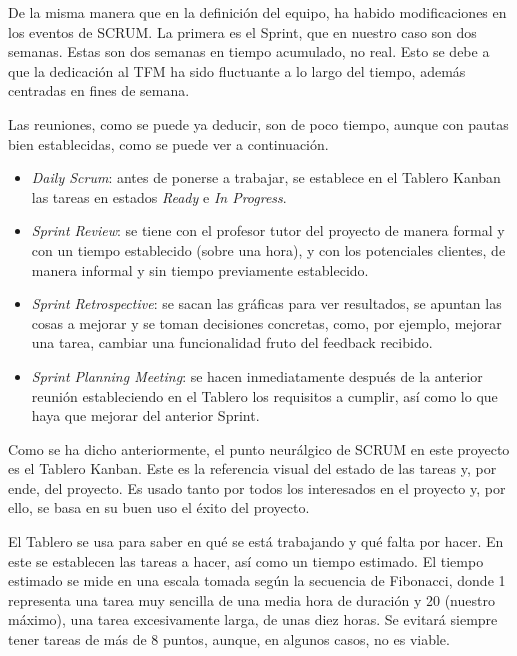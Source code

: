 De la misma manera que en la definición del equipo, ha habido modificaciones en los eventos de SCRUM. La primera es el Sprint, que en nuestro caso son dos semanas. Estas son dos semanas en tiempo acumulado, no real. Esto se debe a que la dedicación al TFM ha sido fluctuante a lo largo del tiempo, además centradas en fines de semana.

Las reuniones, como se puede ya deducir, son de poco tiempo, aunque con pautas bien establecidas, como se puede ver a continuación.
\begin{itemize}
    \item \textit{Daily Scrum}: antes de ponerse a trabajar, se establece en el Tablero Kanban las tareas en estados \textit{Ready} e \textit{In Progress}.
    \item \textit{Sprint Review}: se tiene con el profesor tutor del proyecto de manera formal y con un tiempo establecido (sobre una hora), y con los potenciales clientes, de manera informal y sin tiempo previamente establecido.
    \item \textit{Sprint Retrospective}: se sacan las gráficas para ver resultados, se apuntan las cosas a mejorar y se toman decisiones concretas, como, por ejemplo, mejorar una tarea, cambiar una funcionalidad fruto del feedback recibido.
    \item \textit{Sprint Planning Meeting}: se hacen inmediatamente después de la anterior reunión estableciendo en el Tablero los requisitos a cumplir, así como lo que haya que mejorar del anterior Sprint.
\end{itemize}

Como se ha dicho anteriormente, el punto neurálgico de SCRUM en este proyecto es el Tablero Kanban. Este es la referencia visual del estado de las tareas y, por ende, del proyecto. Es usado tanto por todos los interesados en el proyecto y, por ello, se basa en su buen uso el éxito del proyecto.

El Tablero se usa para saber en qué se está trabajando y qué falta por hacer. En este se establecen las tareas a hacer, así como un tiempo estimado. El tiempo estimado se mide en una escala tomada según la secuencia de Fibonacci, donde 1 representa una tarea muy sencilla de una media hora de duración y 20 (nuestro máximo), una tarea excesivamente larga, de unas diez horas. Se evitará siempre tener tareas de más de 8 puntos, aunque, en algunos casos, no es viable.

